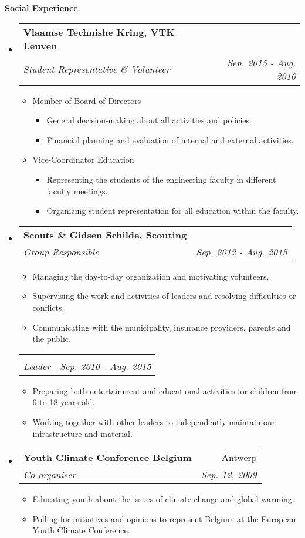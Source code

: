 \documentclass[letterpaper,11pt]{article}
\makeatletter
\newcommand{\resheading}[1]{{\large \colorbox{mygrey}{\begin{minipage}{\textwidth}{\textbf{#1 \vphantom{p\^{E}}}}\end{minipage}}}}
\newcommand{\ressubheading}[4]{
\begin{tabular*}{7.3in}{l@{\extracolsep{\fill}}r}
		\textbf{#1} & #2 \\
		\textit{#3} & \textit{#4} \\
\end{tabular*}\vspace{-6pt}}
\newcommand{\resitem}[1]{\item #1 \vspace{-2pt}}
\newcommand{\noresrepeat}[0]{\vspace{-20pt}}
\makeatother
\begin{document}
\resheading{Social Experience}
\begin{itemize}[leftmargin=*]

\item[]
	\ressubheading{Vlaamse Technishe Kring, VTK Leuven}{ }{Student Representative \& Volunteer}{Sep. 2015 - Aug. 2016}
	\begin{itemize}
		\resitem{Member of Board of Directors}
		\begin{itemize}
			\resitem{General decision-making about all activities and policies.}
			\resitem{Financial planning and evaluation of internal and external activities.}
		\end{itemize}
		\resitem{Vice-Coordinator Education}
		\begin{itemize}
			\resitem{Representing the students of the engineering faculty in different faculty meetings.}
			\resitem{Organizing student representation for all education within the faculty.}
		\end{itemize}
	\end{itemize}

\item[]
	\ressubheading{Scouts \& Gidsen Schilde, Scouting}{ }{Group Responsible}{Sep. 2012 - Aug. 2015}
	\begin{itemize}
			\resitem{Managing the day-to-day organization and motivating volunteers.}
			\resitem{Supervising the work and activities of leaders and resolving difficulties or conflicts.}
			\resitem{Communicating with the municipality, insurance providers, parents and the public.}
	\end{itemize}

	\ressubheading{\noresrepeat}{ }{Leader}{Sep. 2010 - Aug. 2015}
	\begin{itemize}
		\resitem{Preparing both entertainment and educational activities for children from 6 to 18 years old.}
		\resitem{Working together with other leaders to independently maintain our infrastructure and material.}
	\end{itemize}

\item[]
	\ressubheading{Youth Climate Conference Belgium}{Antwerp}{Co-organiser}{Sep. 12, 2009}
	\begin{itemize}
		\resitem{Educating youth about the issues of climate change and global warming.}
		\resitem{Polling for initiatives and opinions to represent Belgium at the European Youth Climate Conference.}
	\end{itemize}


\end{itemize}
\end{document}
